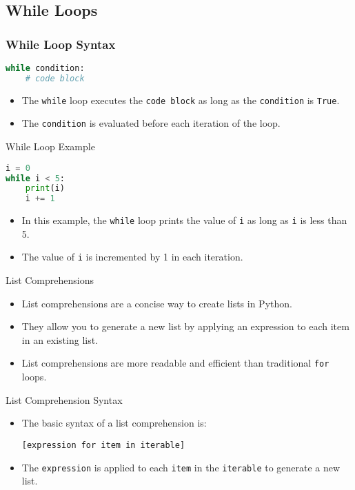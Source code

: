 \subsection{While Loops}
\begin{frame}[fragile]
    \frametitle{While Loop Syntax}
    \begin{lstlisting}[style=colorful, language=Python]
while condition:
    # code block
    \end{lstlisting}
    \begin{itemize}
        \item The \texttt{while} loop executes the \texttt{code block} as long as the \texttt{condition} is \texttt{True}.
        \item The \texttt{condition} is evaluated before each iteration of the loop.
    \end{itemize}
\end{frame}

\begin{frame}[fragile]{While Loop Example}
    \begin{lstlisting}[style=colorful, language=Python]
i = 0
while i < 5:
    print(i)
    i += 1
    \end{lstlisting}
    \begin{itemize}
        \item In this example, the \texttt{while} loop prints the value of \texttt{i} as long as \texttt{i} is less than 5.
        \item The value of \texttt{i} is incremented by 1 in each iteration.
    \end{itemize}
\end{frame}


\begin{frame}{List Comprehensions}
    \begin{itemize}
        \item List comprehensions are a concise way to create lists in Python.
        \item They allow you to generate a new list by applying an expression to each item in an existing list.
        \item List comprehensions are more readable and efficient than traditional \texttt{for} loops.
    \end{itemize}
\end{frame}

\begin{frame}{List Comprehension Syntax}
    \begin{itemize}
        \item The basic syntax of a list comprehension is:
        \begin{center}
            \texttt{[expression for item in iterable]}
        \end{center}
        \item The \texttt{expression} is applied to each \texttt{item} in the \texttt{iterable} to generate a new list.
    \end{itemize}
\end{frame}


